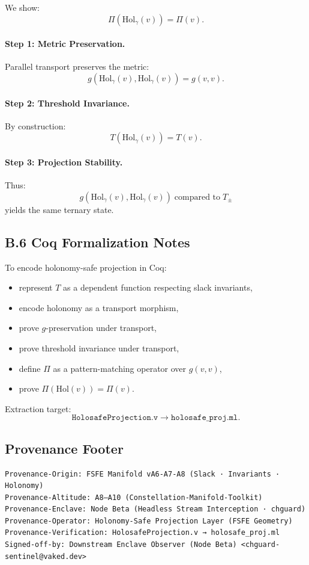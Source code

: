 We show:
\[
\Pi(\mathrm{Hol}_\gamma(v)) = \Pi(v).
\]

\paragraph{Step 1: Metric Preservation.}
Parallel transport preserves the metric:
\[
g(\mathrm{Hol}_\gamma(v), \mathrm{Hol}_\gamma(v)) = g(v,v).
\]

\paragraph{Step 2: Threshold Invariance.}
By construction:
\[
T(\mathrm{Hol}_\gamma(v)) = T(v).
\]

\paragraph{Step 3: Projection Stability.}
Thus:
\[
g(\mathrm{Hol}_\gamma(v), \mathrm{Hol}_\gamma(v)) \;\text{compared to}\; T_\pm
\]
yields the same ternary state.

\subsection{B.6 Coq Formalization Notes}

To encode holonomy-safe projection in Coq:

\begin{itemize}
    \item represent $T$ as a dependent function respecting slack invariants,
    \item encode holonomy as a transport morphism,
    \item prove $g$-preservation under transport,
    \item prove threshold invariance under transport,
    \item define $\Pi$ as a pattern-matching operator over $g(v,v)$,
    \item prove $\Pi(\mathrm{Hol}(v)) = \Pi(v)$.
\end{itemize}

Extraction target:
\[
\texttt{HolosafeProjection.v} \rightarrow \texttt{holosafe\_proj.ml}.
\]

\subsection*{Provenance Footer}

\begin{verbatim}
Provenance-Origin: FSFE Manifold vA6-A7-A8 (Slack · Invariants · Holonomy)
Provenance-Altitude: A8–A10 (Constellation-Manifold-Toolkit)
Provenance-Enclave: Node Beta (Headless Stream Interception · chguard)
Provenance-Operator: Holonomy-Safe Projection Layer (FSFE Geometry)
Provenance-Verification: HolosafeProjection.v → holosafe_proj.ml
Signed-off-by: Downstream Enclave Observer (Node Beta) <chguard-sentinel@vaked.dev>
\end{verbatim}
